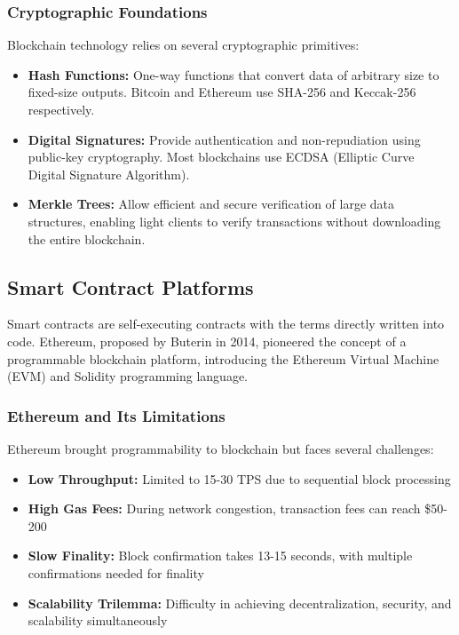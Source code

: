 \documentclass[a4paper,13pt,twoside]{report}
\theoremstyle{definition}
\begin{document}
\subsubsection{Cryptographic Foundations}

Blockchain technology relies on several cryptographic primitives:

\begin{itemize}
    \item \textbf{Hash Functions:} One-way functions that convert data of arbitrary size to fixed-size outputs. Bitcoin and Ethereum use SHA-256 and Keccak-256 respectively.

    \item \textbf{Digital Signatures:} Provide authentication and non-repudiation using public-key cryptography. Most blockchains use ECDSA (Elliptic Curve Digital Signature Algorithm).

    \item \textbf{Merkle Trees:} Allow efficient and secure verification of large data structures, enabling light clients to verify transactions without downloading the entire blockchain.
\end{itemize}

\subsection{Smart Contract Platforms}

Smart contracts are self-executing contracts with the terms directly written into code. Ethereum, proposed by Buterin in 2014\cite{buterin2014ethereum}, pioneered the concept of a programmable blockchain platform, introducing the Ethereum Virtual Machine (EVM) and Solidity programming language.

\subsubsection{Ethereum and Its Limitations}

Ethereum brought programmability to blockchain but faces several challenges:

\begin{itemize}
    \item \textbf{Low Throughput:} Limited to 15-30 TPS due to sequential block processing
    \item \textbf{High Gas Fees:} During network congestion, transaction fees can reach \$50-200
    \item \textbf{Slow Finality:} Block confirmation takes 13-15 seconds, with multiple confirmations needed for finality
    \item \textbf{Scalability Trilemma:} Difficulty in achieving decentralization, security, and scalability simultaneously
\end{itemize}
\end{document}
